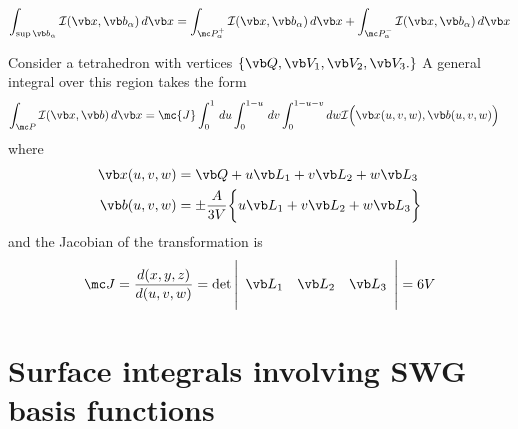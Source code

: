 \documentclass[letterpaper]{article}
\begin{document}
\begin{align*}
 \int_{\sup \vb b_\alpha} \mathcal{I}(\vb x, \vb b_\alpha) \, d\vb x
&= 
  \int_{\mc P_\alpha^+} \mathcal{I}(\vb x, \vb b_\alpha) \, d\vb x
 +\int_{\mc P_\alpha^-} \mathcal{I}(\vb x, \vb b_\alpha) \, d\vb x
\\
\end{align*}

Consider a tetrahedron with vertices 
$\{\vb Q, \vb V_1, \vb V_2, \vb V_3.\}$ 
A general
integral over this region takes the form
\begin{align*}
 \int_{\mc P} \mathcal{I}(\vb x, \vb b ) \, d\vb x
&=\mc{J} \int_0^1 \, du \int_0^{1-u} \, dv \int_0^{1-u-v} dw
  \mathcal{I}\Big( \vb x(u,v,w), \vb b(u,v,w) \Big)
\end{align*}
where
\begin{align*}
 \vb x(u,v,w) 
&= 
 \vb Q + u\vb L_1 + v\vb L_2 + w\vb L_3 
\\
 \vb b(u,v,w) 
&= 
 \pm \frac{A}{3V}\bigg\{ u \vb L_1 
                        +v \vb L_2 
                        +w \vb L_3 
                 \bigg\}
\end{align*}
and the Jacobian of the transformation is 
$$\mc J=\frac{d(x,y,z)}{d(u,v,w)}
   =\det\left|\begin{array}{ccc} 
     \\
     \vb L_1 & \vb L_2 & \vb L_3 \\
     \\
     \end{array}\right|
  =6V
$$

\section{Surface integrals involving SWG basis functions}
\end{document}
